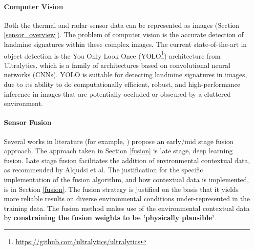     \paragraph{Computer Vision} 

        Both the thermal and radar sensor data can be represented as images (Section \ref{sensor_overview}). The problem of computer vision is the accurate detection of landmine signatures within these complex images. The current state-of-the-art in object detection is the You Only Look Once (YOLO\footnote{\url{https://github.com/ultralytics/ultralytics}}) architecture from Ultralytics, which is a family of architectures based on convolutional neural networks (CNNs). YOLO is suitable for detecting landmine signatures in images, due to its ability to do computationally efficient, robust, and high-performance inference in images that are potentially occluded or obscured by a cluttered environment.
    
    \paragraph{Sensor Fusion} 
    
        \noindent Several works in literature (for example, \cite{qui2023fusion}) propose an early/mid stage fusion approach. The approach taken in Section \ref{fusion} is late stage, deep learning fusion. Late stage fusion facilitates the addition of environmental contextual data, as recommended by Alqudsi et al. The justification for the specific implementation of the fusion algorithm, and how contextual data is implemented, is in Section \ref{fusion}. The fusion strategy is justified on the basis that it yields more reliable results on diverse environmental conditions under-represented in the training data. The fusion method makes use of the environmental contextual data by \textbf{constraining the fusion weights to be 'physically plausible'}.
    


